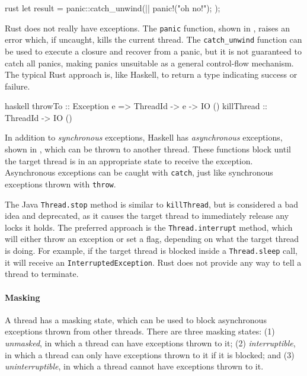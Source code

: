\begin{listing}
\centering
\begin{cminted}{rust}
let result = panic::catch_unwind(|| {
    panic!("oh no!");
});
\end{cminted}
\caption{Panics in Rust.}\label{lst:excs_rust}
\end{listing}

Rust does not really have exceptions.  The \verb|panic| function,
shown in , raises an error which, if uncaught,
kills the current thread.  The \verb|catch_unwind| function can be
used to execute a closure and recover from a panic, but it is not
guaranteed to catch all panics\cite{catch_unwind}, making panics
unsuitable as a general control-flow mechanism.  The typical Rust
approach is, like Haskell, to return a type indicating success or
failure.

\begin{listing}
\centering
\begin{cminted}{haskell}
throwTo    :: Exception e => ThreadId -> e -> IO ()
killThread :: ThreadId -> IO ()
\end{cminted}
\caption{Asynchronous exceptions in Haskell.}\label{lst:excsa_haskell}
\end{listing}

In addition to \emph{synchronous} exceptions, Haskell has
\emph{asynchronous} exceptions, shown in ,
which can be thrown to another thread.  These functions block until
the target thread is in an appropriate state to receive the exception.
Asynchronous exceptions can be caught with \verb|catch|, just like
synchronous exceptions thrown with \verb|throw|.

The Java \verb|Thread.stop| method is similar to \verb|killThread|,
but is considered a bad idea and deprecated, as it causes the target
thread to immediately release any locks it holds\cite{oracle2017}.
The preferred approach is the \verb|Thread.interrupt| method, which
will either throw an exception or set a flag, depending on what the
target thread is doing.  For example, if the target thread is blocked
inside a \verb|Thread.sleep| call, it will receive an
\verb|InterruptedException|.  Rust does not provide any way to tell a
thread to terminate.

\paragraph{Masking}
A thread has a masking state, which can be used to block asynchronous
exceptions thrown from other threads.  There are three masking states:
(1) \emph{unmasked}, in which a thread can have exceptions thrown to
it; (2) \emph{interruptible}, in which a thread can only have
exceptions thrown to it if it is blocked; and (3)
\emph{uninterruptible}, in which a thread cannot have exceptions
thrown to it.

